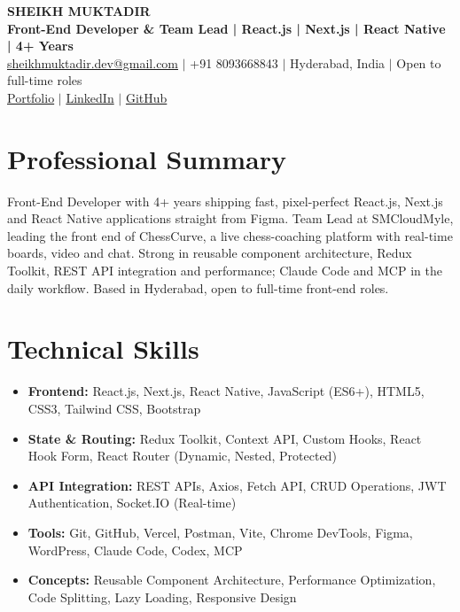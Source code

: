 \documentclass[a4paper,10pt]{article}
\begin{document}
\begin{center}
    {\Huge \textbf{SHEIKH MUKTADIR}} \\
    \vspace{3pt}
    {\large \textbf{Front-End Developer \& Team Lead | React.js | Next.js | React Native | 4+ Years}} \\
    \vspace{3pt}
    \href{mailto:sheikhmuktadir.dev@gmail.com}{\color{primaryBlue}sheikhmuktadir.dev@gmail.com} $|$ +91 8093668843 $|$ Hyderabad, India $|$ Open to full-time roles \\
    \href{https://sheikh-muktadir-portfolio-nu.vercel.app/}{\color{primaryBlue}Portfolio} $|$
    \href{https://www.linkedin.com/in/sheikhmuktadir-dev/}{\color{primaryBlue}LinkedIn} $|$
    \href{https://github.com/sheikhmuktadir-dev}{\color{primaryBlue}GitHub}\\
\end{center}

\section{Professional Summary}
Front-End Developer with 4+ years shipping fast, pixel-perfect React.js, Next.js and React Native applications straight from Figma. Team Lead at SMCloudMyle, leading the front end of ChessCurve, a live chess-coaching platform with real-time boards, video and chat. Strong in reusable component architecture, Redux Toolkit, REST API integration and performance; Claude Code and MCP in the daily workflow. Based in Hyderabad, open to full-time front-end roles.

\section{Technical Skills}
\begin{itemize}
    \item \textbf{Frontend:} React.js, Next.js, React Native, JavaScript (ES6+), HTML5, CSS3, Tailwind CSS, Bootstrap
    \item \textbf{State \& Routing:} Redux Toolkit, Context API, Custom Hooks, React Hook Form, React Router (Dynamic, Nested, Protected)
    \item \textbf{API Integration:} REST APIs, Axios, Fetch API, CRUD Operations, JWT Authentication, Socket.IO (Real-time)
    \item \textbf{Tools:} Git, GitHub, Vercel, Postman, Vite, Chrome DevTools, Figma, WordPress, Claude Code, Codex, MCP
    \item \textbf{Concepts:} Reusable Component Architecture, Performance Optimization, Code Splitting, Lazy Loading, Responsive Design
\end{itemize}
\end{document}
